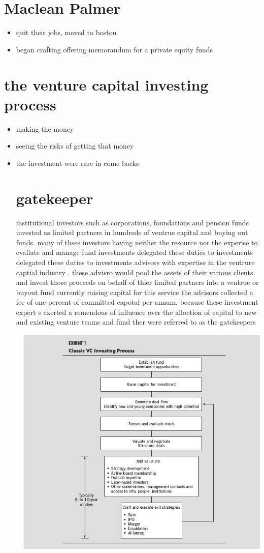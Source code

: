 \documentclass{article}
\begin{document}
\section*{Maclean Palmer}

\begin{itemize}
\item quit their jobs, moved to boston  
\item began crafting offering memorandum for a private  equity funds  
\end{itemize}
\section*{the venture capital investing process}

\begin{itemize}
\item making the money 
\item seeing the risks of getting that money 
\item the investment were rare in come backs 
\section*{gatekeeper}
institutional investors such as corporations, foundations and pension funds invested as limited partners in hundreds of ventrue capital and buying  out funds. many of thses investors  having neither the resource nor the experise to evaliate and manage fund investments delegated these duties to investments delegated these duties to investments advisors with expertise in the ventrure captial industry . these advisro would pool the assets of their various clients and invest those proceeds on behalf of thier limited partners into a ventrue or buyout  fund currently raising capital for this service the adcisors collected a fee of one percent of committed capotal per annum. because  these investment expert s exerted a remendous of influence over the alloction of capital to new and existing venture teams and fund ther were referred to  as the gatekeepers 

\vspace{100mm}
\includegraphics[scale=.5]{chart2.png}


\end{itemize}
\end{document}
